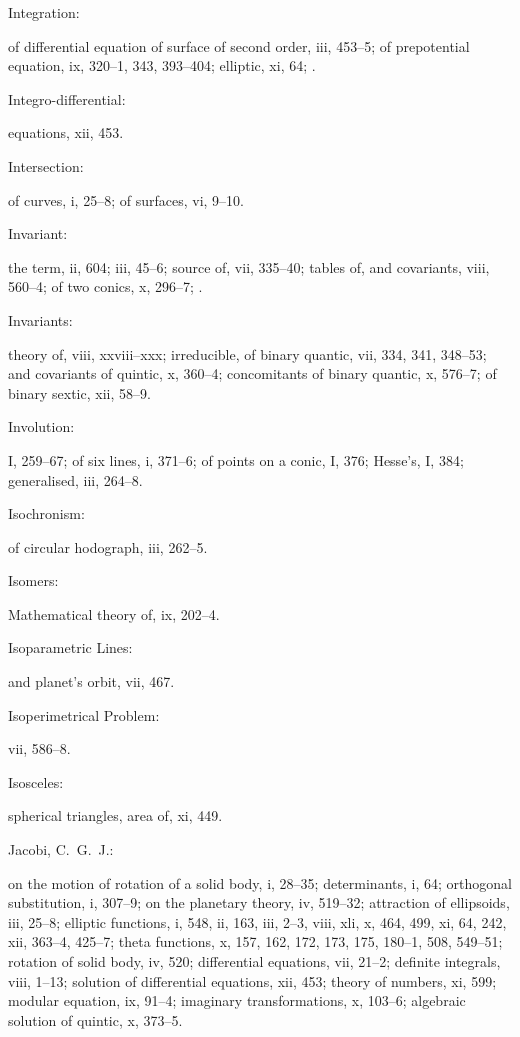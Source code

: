 \documentclass[11pt,a4paper]{book}
\providecommand{\V}[1]{#1}
\providecommand{\IndexEntry}[2]{#1\dotfill #2\par}
\begin{document}
\IndexEntry{Integration}: of differential equation of surface of second order, \V{iii}, 453--5; of prepotential equation, \V{ix}, 320--1, 343, 393--404; elliptic, \V{xi}, 64; .

\IndexEntry{Integro-differential}: equations, \V{xii}, 453.

\IndexEntry{Intersection}: of curves, \V{i}, 25--8; of surfaces, \V{vi}, 9--10.

\IndexEntry{Invariant}: the term, \V{ii}, 604; \V{iii}, 45--6; source of, \V{vii}, 335--40; tables of, and covariants, \V{viii}, 560--4; of two conics, \V{x}, 296--7; .

\IndexEntry{Invariants}: theory of, \V{viii}, xxviii--xxx; irreducible, of binary quantic, \V{vii}, 334, 341, 348--53; and covariants of quintic, \V{x}, 360--4; concomitants of binary quantic, \V{x}, 576--7; of binary sextic, \V{xii}, 58--9.

\IndexEntry{Involution}: \V{I}, 259--67; of six lines, \V{i}, 371--6; of points on a conic, \V{I}, 376; Hesse's, \V{I}, 384; generalised, \V{iii}, 264--8.

\IndexEntry{Isochronism}: of circular hodograph, \V{iii}, 262--5.

\IndexEntry{Isomers}: Mathematical theory of, \V{ix}, 202--4.

\IndexEntry{Isoparametric Lines}: and planet's orbit, \V{vii}, 467.

\IndexEntry{Isoperimetrical Problem}: \V{vii}, 586--8.

\newpage

\setcounter{page}{106}

\IndexEntry{Isosceles}: spherical triangles, area of, \V{xi}, 449.

\IndexEntry{Jacobi, C.\ G.\ J.}: on the motion of rotation of a solid body, \V{i}, 28--35; determinants, \V{i}, 64; orthogonal substitution, \V{i}, 307--9; on the planetary theory, \V{iv}, 519--32; attraction of ellipsoids, \V{iii}, 25--8; elliptic functions, \V{i}, 548, \V{ii}, 163, \V{iii}, 2--3, \V{viii}, xli, \V{x}, 464, 499, \V{xi}, 64, 242, \V{xii}, 363--4, 425--7; theta functions, \V{x}, 157, 162, 172, 173, 175, 180--1, 508, 549--51; rotation of solid body, \V{iv}, 520; differential equations, \V{vii}, 21--2; definite integrals, \V{viii}, 1--13; solution of differential equations, \V{xii}, 453; theory of numbers, \V{xi}, 599; modular equation, \V{ix}, 91--4; imaginary transformations, \V{x}, 103--6; algebraic solution of quintic, \V{x}, 373--5.
\end{document}
